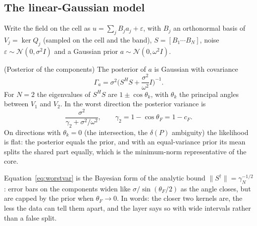 \subsection{The linear-Gaussian model}
Write the field on the cell as $u=\sum_jB_ja_j+\varepsilon$, with $B_j$ an orthonormal basis of $V_j=\ker Q_j$ (sampled on the cell and the band), $S=[B_1\cdots B_N]$, noise $\varepsilon\sim\mathcal N(0,\sigma^2I)$ and a Gaussian prior $a\sim\mathcal N(0,\omega^2I)$.

\begin{theorem}{(Posterior of the components)  \impl}\label{thm:bsplit}
The posterior of $a$ is Gaussian with covariance
\begin{equation}\label{eq:postcov}
\Gamma_a=\sigma^2\Big(S^{H}S+\frac{\sigma^2}{\omega^2}I\Big)^{-1}.
\end{equation}
For $N=2$ the eigenvalues of $S^{H}S$ are $1\pm\cos\theta_k$, with $\theta_k$ the principal angles between $V_1$ and $V_2$. In the worst direction the posterior variance is
\begin{equation}\label{eq:worstvar}
\frac{\sigma^2}{\gamma_2+\sigma^2/\omega^2},\qquad \gamma_2=1-\cos\theta_F=1-c_F.
\end{equation}
On directions with $\theta_k=0$ (the intersection, the $\delta(P)$ ambiguity) the likelihood is flat: the posterior equals the prior, and with an equal-variance prior its mean splits the shared part equally, which is the minimum-norm representative of the core.
\end{theorem}
\begin{intuition}
Equation~\eqref{eq:worstvar} is the Bayesian form of the analytic bound $\|S^{\dagger}\|=\gamma_N^{-1/2}$: error bars on the components widen like $\sigma/\sin(\theta_F/2)$ as the angle closes, but are capped by the prior when $\theta_F\to0$. In words: the closer two kernels are, the less the data can tell them apart, and the layer says so with wide intervals rather than a false split.
\end{intuition}

